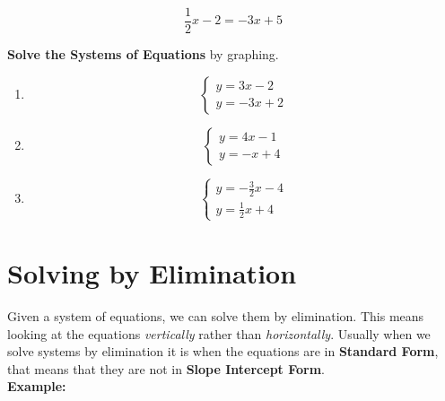 \documentclass[11pt]{article}
\begin{document}
\vspace{1cm}

$$\frac{1}{2}x-2=-3x+5$$


\pagebreak

\textbf{Solve the Systems of Equations} by graphing.\\

\begin{enumerate}
	
	\item \begin{equation*}
		\begin{cases}
			y=3x-2\\
			y=-3x+2	
		\end{cases}
	\end{equation*}

\vspace{2in}

	\item \begin{equation*}
		\begin{cases}
			y=4x-1\\
			y=-x+4	
		\end{cases}
	\end{equation*}
	
\vspace{2in}

	\item \begin{equation*}
		\begin{cases}
			y=-\frac{3}{2}x-4\\
			y=\frac{1}{2}x+4
		\end{cases}
	\end{equation*}
	


\end{enumerate}

\section*{Solving by Elimination}

Given a system of equations, we can solve them by elimination. This means looking at the equations \textit{vertically} rather than \textit{horizontally}. Usually when we solve systems by elimination it is when the equations are in \textbf{Standard Form}, that means that they are not in \textbf{Slope Intercept Form}.\\

\textbf{Example:}\\
\end{document}
